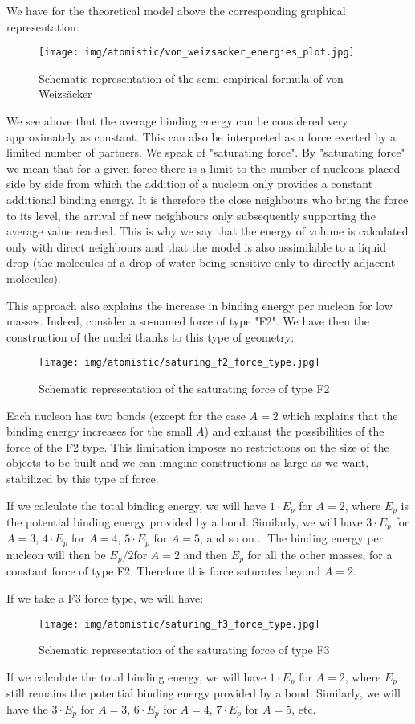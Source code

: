 	We have for the theoretical model above the corresponding graphical representation:
	\begin{figure}[H]
		\centering
		\texttt{[image: img/atomistic/von\_weizsacker\_energies\_plot.jpg]}
		\caption{Schematic representation of the semi-empirical formula of von Weizsäcker}
	\end{figure}
	We see above that the average binding energy can be considered very approximately as constant. This can also be interpreted as a force exerted by a limited number of partners. We speak of "saturating force". By "saturating force" we mean that for a given force there is a limit to the number of nucleons placed side by side from which the addition of a nucleon only provides a constant additional binding energy. It is therefore the close neighbours who bring the force to its level, the arrival of new neighbours only subsequently supporting the average value reached. This is why we say that the energy of volume is calculated only with direct neighbours and that the model is also assimilable to a liquid drop (the molecules of a drop of water being sensitive only to directly adjacent molecules).

	This approach also explains the increase in binding energy per nucleon for low masses. Indeed, consider a so-named force of type "F2". We have then the construction of the nuclei thanks to this type of geometry:
	\begin{figure}[H]
		\centering
		\texttt{[image: img/atomistic/saturing\_f2\_force\_type.jpg]}
		\caption[]{Schematic representation of the saturating force of type F2}
	\end{figure}
	Each nucleon has two bonds (except for the case $A = 2$ which explains that the binding energy increases for the small $A$) and exhaust the possibilities of the force of the F2 type. This limitation imposes no restrictions on the size of the objects to be built and we can imagine constructions as large as we want, stabilized by this type of force.
	
	If we calculate the total binding energy, we will have $1\cdot E_p$ for $A = 2$, where $E_p$ is the potential binding energy provided by a bond. Similarly, we will have $3\cdot E_p$ for $A = 3$, $4\cdot E_p$ for $A = 4$, $5\cdot E_p$ for $A = 5$, and so on... The binding energy per nucleon will then be $E_p/2 $for $A = 2$ and then $E_p$ for all the other masses, for a constant force of type F2. Therefore this force saturates beyond $A = 2$.

	If we take a F3 force type, we will have:
	\begin{figure}[H]
		\centering
		\texttt{[image: img/atomistic/saturing\_f3\_force\_type.jpg]}
		\caption[]{Schematic representation of the saturating force of type F3}
	\end{figure}
	If we calculate the total binding energy, we will have $1\cdot E_p$ for $A = 2$, where $E_p$ still remains the potential binding energy provided by a bond. Similarly, we will have the $3\cdot E_p$ for $A = 3$, $6\cdot E_p$ for $A = 4$, $7\cdot E_p$ for $A = 5$, etc.
	
